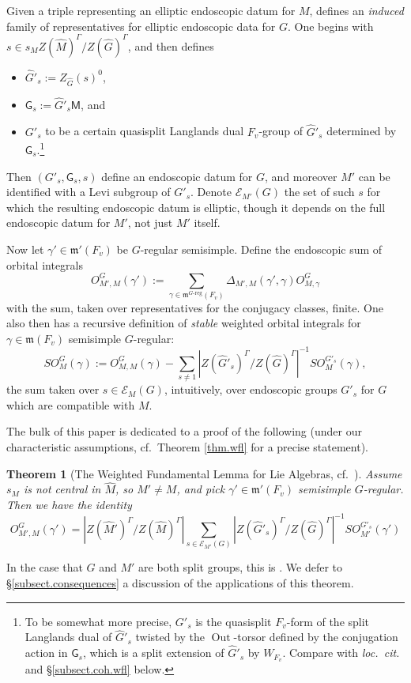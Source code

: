 \documentclass[openany]{amsbook}
\newtheorem{theorem}{Theorem}[chapter]
\theoremstyle{definition}
\theoremstyle{remark}
\numberwithin{equation}{section}
\newcommand{\cE}{\mathcal{E}}
\newcommand{\eM}{\mathsf{M}}
\newcommand{\eG}{\mathsf{G}}
\renewcommand{\-}{\operatorname{-}}
\newcommand{\Out}{\operatorname{Out}}
\newcommand{\fm}{\mathfrak{m}}
\renewcommand{\fm}{\mathfrak{m}}
\begin{document}
Given a triple representing an elliptic endoscopic datum for $M$, \cite[\S 4]{arthurenddatalevi} defines an \textit{induced} family of representatives for elliptic endoscopic data for $G$. One begins with $s \in s_M Z(\widehat{M})^\Gamma/Z(\widehat{G})^\Gamma$, and then defines
\begin{itemize}
    \item $\widehat{G}'_s := Z_{\widehat{G}}(s)^0$,
    \item $\eG_s := \widehat{G}'_s \eM$, and
    \item $G'_s$ to be a certain quasisplit Langlands dual $F_v$-group of $\widehat{G}'_s$ determined by $\eG_s$.\footnote{To be somewhat more precise, $G'_s$ is the quasisplit $F_v$-form of the split Langlands dual of $\widehat{G}'_s$ twisted by the $\Out$-torsor defined by the conjugation action in $\eG_s$, which is a split extension of $\widehat{G}'_s$ by $W_{F_v}$. Compare with \textit{loc.\ cit.} and \S \ref{subsect.coh.wfl} below.}
\end{itemize}
Then $(G'_s, \eG_s, s)$ define an endoscopic datum for $G$, and moreover $M'$ can be identified with a Levi subgroup of $G'_s$. Denote $\cE_{M'}(G)$ the set of such $s$ for which the resulting endoscopic datum is elliptic, though it depends on the full endoscopic datum for $M'$, not just $M'$ itself.

Now let $\gamma' \in \fm'(F_v)$ be $G$-regular semisimple. Define the endoscopic sum of orbital integrals
$$
    O_{M',M}^G(\gamma') := \sum_{\gamma \in \fm^{G\text{-reg}}(F_v)} \Delta_{M',M}(\gamma', \gamma) O_{M, \gamma}^G
$$
with the sum, taken over representatives for the conjugacy classes, finite. One also then has a recursive definition of \textit{stable} weighted orbital integrals for $\gamma \in \fm(F_v)$ semisimple $G$-regular:
$$
    SO_{M}^{G}(\gamma) := O^G_{M,M}(\gamma) - \sum_{s \neq 1}   |Z(\widehat{G}'_s)^\Gamma /Z(\widehat{G})^\Gamma|^{-1} SO_{M}^{G'_s}(\gamma),
$$
the sum taken over $s \in \cE_{M}(G)$, intuitively, over endoscopic groups $G'_s$ for $G$ which are compatible with $M$.

The bulk of this paper is dedicated to a proof of the following (under our characteristic assumptions, cf.\ Theorem \ref{thm.wfl} for a precise statement).

\begin{theorem}[{{The Weighted Fundamental Lemma for Lie Algebras, cf.\ \cite[Conjecture 5.1]{ArthurStableI}}}]
    Assume $s_M$ is not central in $\widehat{M}$, so $M' \neq M$, and pick $\gamma' \in \fm'(F_v)$ semisimple $G$-regular. Then we have the identity
    $$
        O_{M',M}^G(\gamma') = | Z(\widehat{M}')^\Gamma/ Z(\widehat{M})^\Gamma| \sum_{s \in \cE_{M'}(G)} |Z(\widehat{G}'_s)^\Gamma/Z(\widehat{G})^\Gamma|^{-1} SO_{M'}^{G'_s}(\gamma')
    $$
\end{theorem}
In the case that $G$ and $M'$ are both split groups, this is \cite[Th\'eor\'eme 19.1.1]{CLII}. We defer to \S \ref{subsect.consequences} a discussion of the applications of this theorem.
\end{document}
